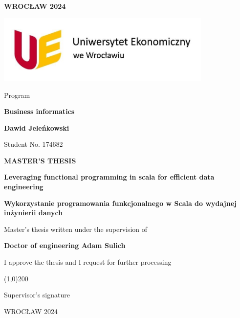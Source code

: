 \begin{titlepage}
\begin{center}
\textbf{WROCŁAW 2024}

\vspace{0cm}
\includegraphics[width=0.8\textwidth]{images/uewroc.jpg}

\vspace{0cm}
Program

\textbf{Business informatics}

\vspace{0cm}
{\Large \textbf{Dawid Jeleńkowski}}

Student No. 174682

\vspace{1cm}
\textbf{MASTER’S THESIS}

\vspace{1cm}
{\huge \textbf{Leveraging functional programming in scala for efficient data engineering}}

\textbf{Wykorzystanie programowania funkcjonalnego w Scala do wydajnej inżynierii danych}

\vspace{2cm}
Master’s thesis written under the supervision of

{\Large \textbf{Doctor of engineering Adam Sulich}}

\vspace{1cm}
I approve the thesis and I request for further processing

\vspace{0cm}
\line(1,0){200}

Supervisor’s signature

\vspace{0cm}
WROCŁAW 2024
\end{center}
\end{titlepage}